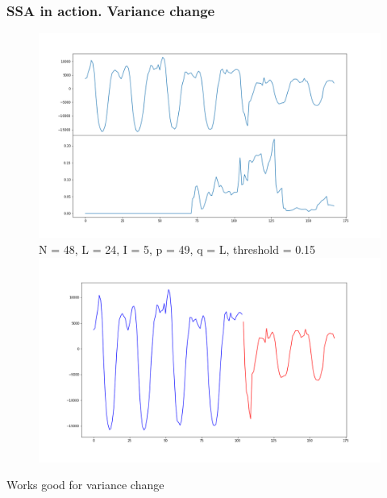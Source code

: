 \documentclass[intlimits, 9pt, unicode]{beamer}
\begin{document}
\begin{frame}
    \frametitle{SSA in action. Variance change}

\begin{figure}
	\includegraphics[scale=0.10]{images/019_variance_cp}
	N = 48, L = 24, I = 5, p = 49, q = L, threshold = 0.15
	\includegraphics[scale=0.10]{images/020_variance_cp_detected}
\end{figure}

Works good for variance change

\end{frame}
\end{document}
